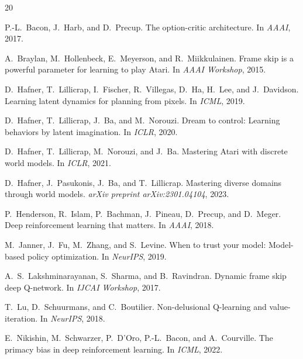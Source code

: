 \documentclass[10pt,letterpaper]{article}
\begin{document}
\begin{thebibliography}{20}

P.-L.~Bacon, J.~Harb, and D.~Precup.
\newblock The option-critic architecture.
\newblock In \emph{AAAI}, 2017.

A.~Braylan, M.~Hollenbeck, E.~Meyerson, and R.~Miikkulainen.
\newblock Frame skip is a powerful parameter for learning to play {A}tari.
\newblock In \emph{AAAI Workshop}, 2015.

D.~Hafner, T.~Lillicrap, I.~Fischer, R.~Villegas, D.~Ha, H.~Lee, and J.~Davidson.
\newblock Learning latent dynamics for planning from pixels.
\newblock In \emph{ICML}, 2019.

D.~Hafner, T.~Lillicrap, J.~Ba, and M.~Norouzi.
\newblock Dream to control: Learning behaviors by latent imagination.
\newblock In \emph{ICLR}, 2020.

D.~Hafner, T.~Lillicrap, M.~Norouzi, and J.~Ba.
\newblock Mastering {A}tari with discrete world models.
\newblock In \emph{ICLR}, 2021.

D.~Hafner, J.~Pasukonis, J.~Ba, and T.~Lillicrap.
\newblock Mastering diverse domains through world models.
\newblock \emph{arXiv preprint arXiv:2301.04104}, 2023.

P.~Henderson, R.~Islam, P.~Bachman, J.~Pineau, D.~Precup, and D.~Meger.
\newblock Deep reinforcement learning that matters.
\newblock In \emph{AAAI}, 2018.

M.~Janner, J.~Fu, M.~Zhang, and S.~Levine.
\newblock When to trust your model: Model-based policy optimization.
\newblock In \emph{NeurIPS}, 2019.

A.~S.~Lakshminarayanan, S.~Sharma, and B.~Ravindran.
\newblock Dynamic frame skip deep {Q}-network.
\newblock In \emph{IJCAI Workshop}, 2017.

T.~Lu, D.~Schuurmans, and C.~Boutilier.
\newblock Non-delusional {Q}-learning and value-iteration.
\newblock In \emph{NeurIPS}, 2018.

E.~Nikishin, M.~Schwarzer, P.~D'Oro, P.-L.~Bacon, and A.~Courville.
\newblock The primacy bias in deep reinforcement learning.
\newblock In \emph{ICML}, 2022.


\end{thebibliography}
\end{document}

